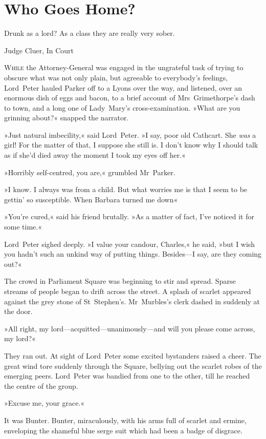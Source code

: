 
\chapter{Who Goes Home?}

\epigraph{Drunk as a lord? As a class they are really very sober.}{Judge Cluer, In Court}


\lettrine[lines=4]{W}{hile} the Attorney-General was engaged in the ungrateful task of trying to obscure what was not only plain, but agreeable to everybody's feelings, Lord~Peter hauled Parker off to a Lyons over the way, and listened, over an enormous dish of eggs and bacon, to a brief account of Mrs~Grimethorpe's dash to town, and a long one of Lady~Mary's cross-examination.
»What are you grinning about?« snapped the narrator.

»Just natural imbecility,« said Lord~Peter. »I say, poor old Cathcart.  She \textit{was} a girl! For the matter of that, I suppose she still is. I don't know why I should talk as if she'd died away the moment I took my eyes off her.«

»Horribly self-centred, you are,« grumbled Mr~Parker.

»I know. I always was from a child. But what worries me is that I seem to be gettin' so susceptible. When Barbara turned me down\longdash«

»You're cured,« said his friend brutally. »As a matter of fact, I've noticed it for some time.«

Lord~Peter sighed deeply. »I value your candour, Charles,« he said, »but I wish you hadn't such an unkind way of putting things. Besides—I say, are they coming out?«

The crowd in Parliament Square was beginning to stir and spread. Sparse streams of people began to drift across the street. A splash of scarlet appeared against the grey stone of St~Stephen's. Mr~Murbles's clerk dashed in suddenly at the door.

»All right, my lord—acquitted—unanimously—and will you please come across, my lord?«

They ran out. At sight of Lord~Peter some excited bystanders raised a cheer. The great wind tore suddenly through the Square, bellying out the scarlet robes of the emerging peers. Lord~Peter was bandied from one to the other, till he reached the centre of the group.

»Excuse me, your grace.«

It was Bunter. Bunter, miraculously, with his arms full of scarlet and ermine, enveloping the shameful blue serge suit which had been a badge of disgrace.

